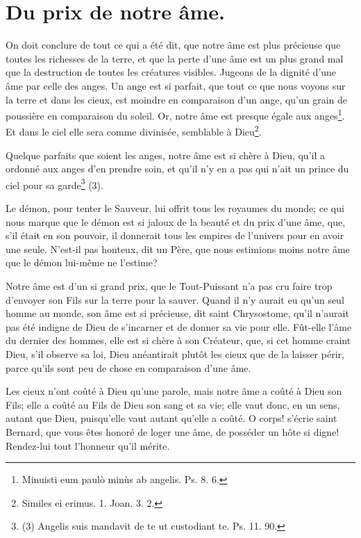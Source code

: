 \documentclass[instructions.tex]{subfiles}
\begin{document}
 
\chapter{Du prix de notre âme.}
 
\primo On doit conclure de tout ce qui a été dit, que notre âme est plus précieuse que toutes les richesses de la terre, et que la perte d’une âme est un plus grand mal que la destruction de toutes les créatures visibles. Jugeons de la dignité d’une âme par celle des anges. Un ange est si parfait, que tout ce que nous voyons sur la terre et dans les cieux, est moindre en comparaison d’un ange, qu’un grain de poussière en comparaison du soleil. Or, notre âme est presque égale aux anges\footnote{Minuisti eum paulò minùs ab angelis. Ps. 8. 6.}. Et dans le ciel elle sera comme divinisée, semblable à Dieu\footnote{Similes ei erimus. 1. Joan. 3. 2.}.
 
Quelque parfaits que soient les anges, notre âme est si chère à Dieu, qu’il a ordonné aux anges d’en prendre soin, et qu’il n’y en a pas qui n’ait un prince du ciel pour sa garde\footnote{(3) Angelis suis mandavit de te ut custodiant te. Ps. 11. 90.} (3).
 
Le démon, pour tenter le Sauveur, lui offrit tous les royaumes du monde; ce qui nous marque que le démon est si jaloux de la beauté et du prix d’une âme, que, s’il était en son pouvoir, il donnerait tous les empires de l’univers pour en avoir une seule. N’est-il pas honteux, dit un Père, que nous estimions moins notre âme que le démon lui-même ne l’estime?
 
\secundo Notre âme est d’un si grand prix, que le Tout-Puissant n’a pas cru faire trop d’envoyer son Fils sur la terre pour la sauver. Quand il n’y aurait eu qu’un seul homme au monde, son âme est si précieuse, dit saint Chrysostome, qu’il n’aurait pas été indigne de Dieu de s’incarner et de donner sa vie pour elle. Fût-elle l’âme du dernier des hommes, elle est si chère à son Créateur, que, si cet homme craint Dieu, s’il observe sa loi, Dieu anéantirait plutôt les cieux que de la laisser périr, parce qu’ils sont peu de chose en comparaison d’une âme.
 
Les cieux n’ont coûté à Dieu qu’une parole, mais notre âme a coûté à Dieu son Fils; elle a coûté au Fils de Dieu son sang et sa vie; elle vaut donc, en un sens, autant que Dieu, puisqu’elle vaut autant qu’elle a coûté. O corps! s’écrie saint Bernard, que vous êtes honoré de loger une âme, de posséder un hôte si digne! Rendez-lui tout l’honneur qu’il mérite.
 
\end{document}

